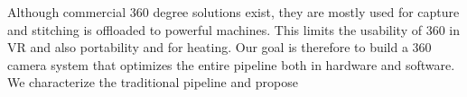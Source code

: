 Although commercial 360 degree solutions exist, they are mostly used for capture and stitching is offloaded to powerful machines. This limits the usability of 360 in VR and also portability and for heating. Our goal is therefore to build a 360 camera system that optimizes the entire pipeline both in hardware and software. We characterize the traditional pipeline and propose



